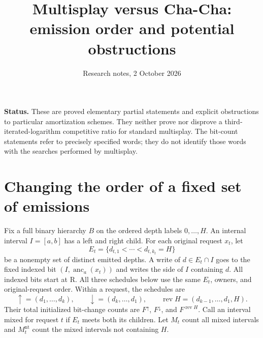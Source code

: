 \documentclass[11pt]{article}
\title{Multisplay versus Cha-Cha:\\emission order and potential obstructions}
\author{Research notes, 2 October 2026}
\date{}
\begin{document}
\maketitle

\noindent\textbf{Status.} These are proved elementary partial statements and
explicit obstructions to particular amortization schemes. They neither prove
nor disprove a third-iterated-logarithm competitive ratio for standard
multisplay. The bit-count statements refer to precisely specified words;
they do not identify those words with the searches performed by multisplay.

\section{Changing the order of a fixed set of emissions}

Fix a full binary hierarchy $B$ on the ordered depth labels
$0,\ldots,H$. An internal interval $I=[a,b]$ has a left and right child.
For each original request $x_t$, let
\[
 E_t=\{d_{t,1}<\cdots<d_{t,k_t}=H\}
\]
be a nonempty set of distinct emitted depths. A write of $d\in E_t\cap I$
goes to the fixed indexed bit $(I,\operatorname{anc}_a(x_t))$ and writes
the side of $I$ containing $d$. All indexed bits start at R.
All three schedules below use the same $E_t$, owners, and original-request
order. Within a request, the schedules are
\[
 \uparrow=(d_1,\ldots,d_k),\qquad
 \downarrow=(d_k,\ldots,d_1),\qquad
 \operatorname{rev}H=(d_{k-1},\ldots,d_1,H).
\]
Their total initialized bit-change counts are $F^\uparrow$, $F^\downarrow$,
and $F^{\operatorname{rev}H}$. Call an interval mixed for request $t$
if $E_t$ meets both its children. Let $M_t$ count all mixed intervals and
$M_t^{\mathrm{nt}}$ count the mixed intervals not containing $H$.
\end{document}
